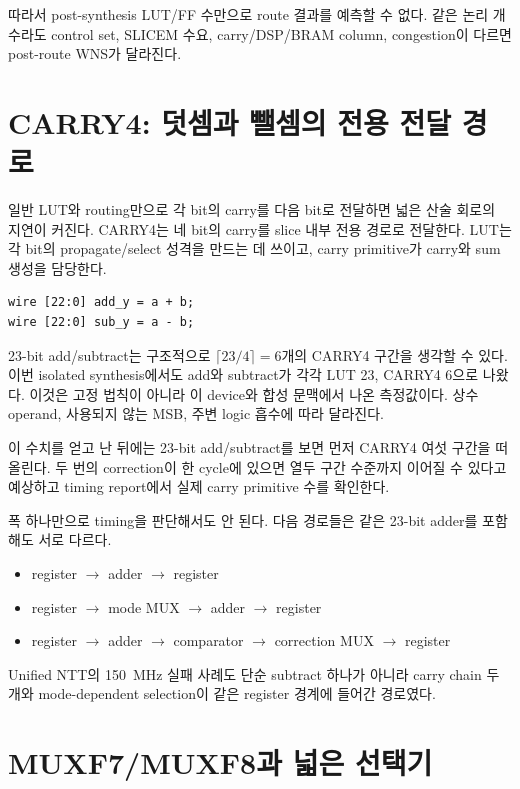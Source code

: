 따라서 post-synthesis LUT/FF 수만으로 route 결과를 예측할 수 없다. 같은 논리
개수라도 control set, SLICEM 수요, carry/DSP/BRAM column, congestion이 다르면
post-route WNS가 달라진다.

\section{CARRY4: 덧셈과 뺄셈의 전용 전달 경로}

일반 LUT와 routing만으로 각 bit의 carry를 다음 bit로 전달하면 넓은 산술 회로의
지연이 커진다. CARRY4는 네 bit의 carry를 slice 내부 전용 경로로 전달한다.
LUT는 각 bit의 propagate/select 성격을 만드는 데 쓰이고, carry primitive가
carry와 sum 생성을 담당한다.

\begin{lstlisting}
wire [22:0] add_y = a + b;
wire [22:0] sub_y = a - b;
\end{lstlisting}

23-bit add/subtract는 구조적으로 $\lceil23/4\rceil=6$개의 CARRY4 구간을
생각할 수 있다. 이번 isolated synthesis에서도 add와 subtract가 각각 LUT 23,
CARRY4 6으로 나왔다. 이것은 고정 법칙이 아니라 이 device와 합성 문맥에서 나온
측정값이다. 상수 operand, 사용되지 않는 MSB, 주변 logic 흡수에 따라 달라진다.

이 수치를 얻고 난 뒤에는 23-bit add/subtract를 보면 먼저 CARRY4 여섯 구간을
떠올린다. 두 번의 correction이 한 cycle에 있으면 열두 구간 수준까지 이어질 수
있다고 예상하고 timing report에서 실제 carry primitive 수를 확인한다.

폭 하나만으로 timing을 판단해서도 안 된다. 다음 경로들은 같은 23-bit adder를
포함해도 서로 다르다.

\begin{itemize}
  \item register $\rightarrow$ adder $\rightarrow$ register
  \item register $\rightarrow$ mode MUX $\rightarrow$ adder $\rightarrow$ register
  \item register $\rightarrow$ adder $\rightarrow$ comparator $\rightarrow$ correction MUX
        $\rightarrow$ register
\end{itemize}

Unified NTT의 150~MHz 실패 사례도 단순 subtract 하나가 아니라 carry chain
두 개와 mode-dependent selection이 같은 register 경계에 들어간 경로였다.

\section{MUXF7/MUXF8과 넓은 선택기}

